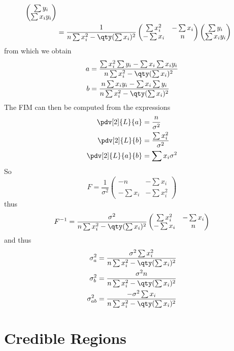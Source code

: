\documentclass{dwnotes}         		        %
\begin{document}
\begin{example}
\begin{align*}
\begin{pmatrix}
    \sum y_i \\ \sum x_i y_i
  \end{pmatrix} \\
&= \frac{1}{n \sum x_i^2 - \qty( \sum x_i )^2}
\begin{pmatrix}
  \sum x_i^2 & - \sum x_i \\ - \sum x_i & n
\end{pmatrix}
\begin{pmatrix}
  \sum y_i \\ \sum x_i y_i
\end{pmatrix}
\end{align*}
from which we obtain
\begin{align*}
  a &= \frac{\sum x_i^2 \sum y_i - \sum x_i \sum x_i y_i}{n \sum x_i^2 - \qty( \sum x_i)^2} \\
b &= \frac{n \sum x_i y_i - \sum x_i \sum y_i}{n \sum x_i^2 - \qty( \sum x_i)^2}
\end{align*}
The FIM can then be computed from the expressions
\begin{align*}
  \pdv[2]{L}{a} &= \frac{n}{\sigma^2} \\
\pdv[2]{L}{b} &= \frac{\sum x_i^2}{\sigma^2} \\
\pdv[2]{L}{a}{b} &= \sum{x_i}{\sigma^2}
\end{align*}
So
\begin{equation*}
  F = \frac{1}{\sigma^2}
  \begin{pmatrix}
    -n & - \sum x_i \\ - \sum x_i & - \sum x_i^2
  \end{pmatrix}
\end{equation*}
thus
\begin{equation*}
  F^{-1} = \frac{\sigma^2}{n \sum x_i^2 - \qty( \sum x_i)^2} 
  \begin{pmatrix}
    \sum x_i^2 & - \sum x_i \\ - \sum x_i & n
  \end{pmatrix}
\end{equation*}
and thus
\begin{align*}
  \sigma^2_a &= \frac{\sigma^2 \sum x_i^2}{n \sum x_i^2 - \qty( \sum x_i)^2} \\
\sigma_b^2 &= \frac{\sigma^2 n}{n \sum x_i^2 - \qty( \sum x_i )^2} \\
\sigma_{ab}^2 &= \frac{- \sigma^2 \sum x_i}{n \sum x_i^2 - \qty( \sum x_i)^2}
\end{align*}
\end{example}

\section{Credible Regions}
\label{sec:credible-regions}
\end{document}
